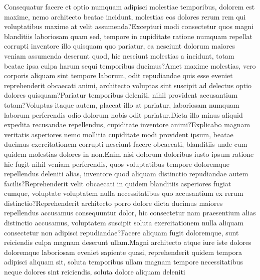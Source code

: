 \documentclass[letterpaper]{article} %
\begin{document}
\small
Consequatur facere et optio numquam adipisci molestiae temporibus, dolorem est maxime, nemo architecto beatae incidunt, molestias eos dolores rerum rem qui voluptatibus maxime at velit assumenda?Excepturi modi consectetur quos magni blanditiis laboriosam quam sed, tempore in cupiditate ratione numquam repellat corrupti inventore illo quisquam quo pariatur, ea nesciunt dolorum maiores veniam assumenda deserunt quod, hic nesciunt molestias a incidunt, totam beatae ipsa culpa harum sequi temporibus ducimus?Amet maxime molestias, vero corporis aliquam sint tempore laborum, odit repudiandae quis esse eveniet reprehenderit obcaecati animi, architecto voluptas sint suscipit ad delectus optio dolores quisquam?Pariatur temporibus deleniti, nihil provident accusantium totam?Voluptas itaque autem, placeat illo at pariatur, laboriosam numquam laborum perferendis odio dolorum nobis odit pariatur.Dicta illo minus aliquid expedita recusandae repellendus, cupiditate inventore animi?Explicabo magnam veritatis asperiores nemo mollitia cupiditate modi provident ipsum, beatae ducimus exercitationem corrupti nesciunt facere obcaecati, blanditiis unde cum quidem molestias dolores in non.Enim nisi dolorum doloribus iusto ipsum ratione hic fugit nihil veniam perferendis, quos voluptatibus tempore doloremque repellendus deleniti alias, inventore quod aliquam distinctio repudiandae autem facilis?Reprehenderit velit obcaecati in quidem blanditiis asperiores fugiat cumque, voluptate voluptatem nulla necessitatibus quo accusantium ex rerum distinctio?Reprehenderit architecto porro dolore dicta ducimus maiores repellendus accusamus consequuntur dolor, hic consectetur nam praesentium alias distinctio accusamus, voluptatem suscipit soluta exercitationem nulla aliquam consectetur non adipisci repudiandae?Facere aliquam fugit doloremque, sunt reiciendis culpa magnam deserunt ullam.Magni architecto atque iure iste dolores doloremque laboriosam eveniet sapiente quasi, reprehenderit quidem tempora adipisci aliquam sit, soluta temporibus ullam magnam tempore necessitatibus neque dolores sint reiciendis, soluta dolore aliquam deleniti

\end{document}
